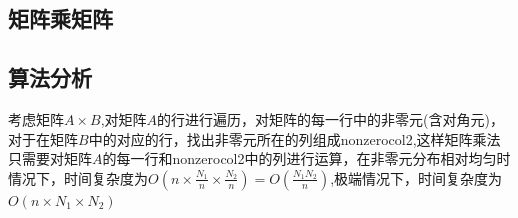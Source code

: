 \documentclass[a4paper,left=2.5cm,right=2.5cm]{article}
\begin{document}
\begin{spacing}{1.6}
		
		\section{矩阵乘矩阵}
		\subsection{算法分析}
		考虑矩阵$A\times B$,对矩阵$A$的行进行遍历，对矩阵的每一行中的非零元(含对角元)，对于在矩阵$B$中的对应的行，找出非零元所在的列组成nonzerocol2,这样矩阵乘法只需要对矩阵$A$的每一行和nonzerocol2中的列进行运算，在非零元分布相对均匀时情况下，时间复杂度为$O(n\times \frac{N_1}{n} \times  \frac{N_2}{n}) = O(\frac{N_1N_2}{n})$,极端情况下，时间复杂度为$O(n\times N_1 \times N_2)$
		

\end{spacing}
\end{document}
